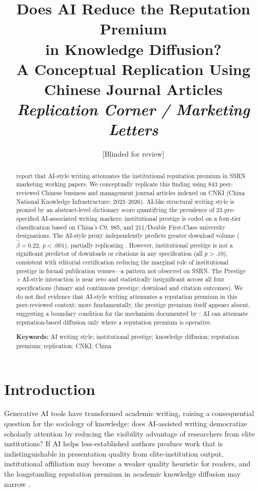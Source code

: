 \documentclass[12pt,a4paper]{article}
\title{\textbf{Does AI Reduce the Reputation Premium\\
in Knowledge Diffusion?\\
A Conceptual Replication Using Chinese Journal Articles}\\[0.8em]
\large\textit{Replication Corner / Marketing Letters}}
\author{[Blinded for review]}
\date{}
\begin{document}
\maketitle

\begin{abstract}
\noindent
\citet{JoLi2026} report that AI-style writing attenuates the
institutional reputation premium in SSRN marketing working papers.
We conceptually replicate this finding using 843 peer-reviewed Chinese
business and management journal articles indexed on CNKI
(China National Knowledge Infrastructure; 2023--2026).
AI-like structural writing style is proxied by an abstract-level
dictionary score quantifying the prevalence of 23 pre-specified
AI-associated writing markers; institutional prestige is coded on a
four-tier classification based on China's C9, 985, and
211/Double First-Class university designations.
The AI-style proxy independently predicts greater download volume
($\hat{\beta}=0.22$, $p<.001$), partially replicating \citet{JoLi2026}.
However, institutional prestige is not a significant predictor of
downloads or citations in any specification (all $p>.10$), consistent
with editorial certification reducing the marginal role of institutional
prestige in formal publication venues---a pattern not observed on SSRN.
The Prestige\,$\times$\,AI-style interaction is near zero and
statistically insignificant across all four specifications (binary and
continuous prestige; download and citation outcomes).
We do not find evidence that AI-style writing attenuates a reputation
premium in this peer-reviewed context; more fundamentally, the prestige
premium itself appears absent, suggesting a boundary condition for the
mechanism documented by \citet{JoLi2026}: AI can attenuate
reputation-based diffusion only where a reputation premium is operative.

\smallskip\noindent
\textbf{Keywords:} AI writing style; institutional prestige; knowledge
diffusion; reputation premium; replication; CNKI; China
\end{abstract}

\newpage

\section{Introduction}
\label{sec:intro}

Generative AI tools have transformed academic writing, raising a
consequential question for the sociology of knowledge: does AI-assisted
writing democratize scholarly attention by reducing the visibility
advantage of researchers from elite institutions?
If AI helps less-established authors produce work that is
indistinguishable in presentation quality from elite-institution output,
institutional affiliation may become a weaker quality heuristic for
readers, and the longstanding reputation premium in academic knowledge
diffusion may narrow
\citep{Merton1968,Spence1973,DiMaggio1983}.
\end{document}
